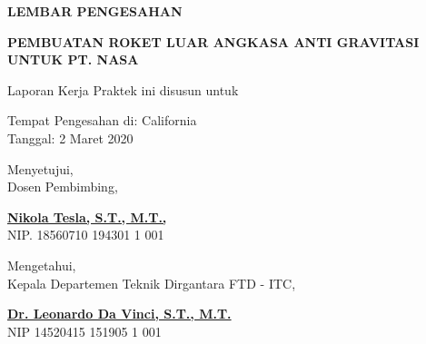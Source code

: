 \begin{center}
  {\Large \textbf{LEMBAR PENGESAHAN}}
  \vspace{6ex}


  {\large \textbf{PEMBUATAN ROKET LUAR ANGKASA ANTI GRAVITASI UNTUK PT. NASA}}
  \vspace{6ex}

  Laporan Kerja Praktek ini disusun untuk \lipsum[1][1]
  \vspace{2ex}

  Tempat Pengesahan di: California \\
  Tanggal: 2 Maret 2020
  \vspace{6ex}

  Menyetujui, \\
  Dosen Pembimbing,
  \vspace{12ex}

  \textbf{\underline{Nikola Tesla, S.T., M.T.,}} \\
  NIP. 18560710 194301 1 001
  \vspace{8ex}

  Mengetahui, \\
  Kepala Departemen Teknik Dirgantara FTD - ITC,
  \vspace{12ex}

  \textbf{\underline{Dr. Leonardo Da Vinci, S.T., M.T.}} \\
  NIP 14520415 151905 1 001

\end{center}